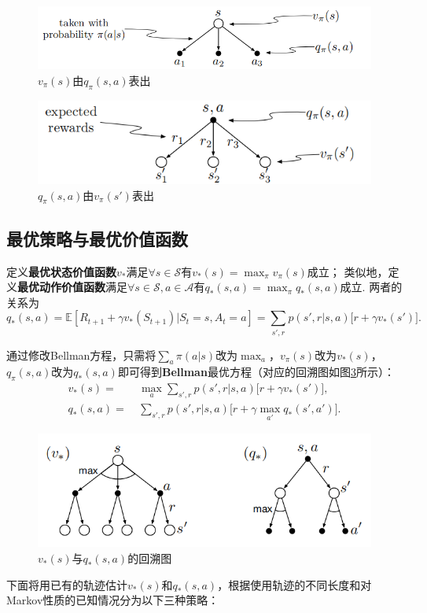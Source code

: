 \documentclass[12pt, a4paper, oneside]{ctexart}
\numberwithin{equation}{section}  %
\def\S{\mathcal{S}}         %
\def\A{\mathcal{A}}         %
\def\E{\mathbb{E}}          %
\begin{document}
\begin{figure}[htbp]
    \centering
    \includegraphics[scale=0.5]{../figures/060页s,(s,a).png}
    \caption{$v_{\pi}(s)$由$q_{\pi}(s,a)$表出}
    \label{fig-状态价值函数由动作价值函数表出}
\end{figure}

\begin{figure}[htbp]
    \centering
    \includegraphics[scale=0.5]{../figures/060页(s,a),s.png}
    \caption{$q_{\pi}(s,a)$由$v_{\pi}(s')$表出}
    \label{fig-动作价值函数由状态价值函数表出}
\end{figure}
\subsection{最优策略与最优价值函数}
定义\textbf{最优状态价值函数}$v_*$满足$\forall s\in \S$有$v_*(s) = \max_{\pi}v_{\pi}(s)$成立；
类似地，定义\textbf{最优动作价值函数}满足$\forall s\in \S, a\in\A$有$q_*(s,a) = \max_{\pi}q_*(s,a)$成立.
两者的关系为
\begin{equation*}
    q_*(s,a) = \E[R_{t+1}+\gamma v_*(S_{t+1})|S_t =s, A_t = a] = \sum_{s', r}p(s',r|s,a)\big[r+\gamma v_*(s')\big].
\end{equation*}

通过修改Bellman方程，只需将$\sum_{a}\pi(a|s)$改为$\max_{a}$，$v_\pi(s)$改为$v_*(s)$，
$q_{\pi}(s,a)$改为$q_*(s,a)$即可得到\textbf{Bellman}最优方程（对应的回溯图如图\ref{fig-状态与动作最优价值函数回溯图}所示）：
\begin{align*}
    v_*(s) =&\ \max_{a}\sum_{s',r}p(s',r|s,a)\big[r+\gamma v_*(s')\big],\\
    q_*(s,a) =&\ \sum_{s',r}p(s',r|s,a)\big[r+\gamma\max_{a'}q_*(s',a')\big].
\end{align*}
\begin{figure}[htbp]
    \centering
    \includegraphics[scale=0.5]{../figures/062页状态与动作最优价值函数回溯图.png}
    \caption{$v_*(s)$与$q_*(s,a)$的回溯图}
    \label{fig-状态与动作最优价值函数回溯图}
\end{figure}
下面将用已有的轨迹估计$v_*(s)$和$q_*(s,a)$，根据使用轨迹的不同长度和对Markov性质的已知情况分为以下三种策略：
\end{document}
